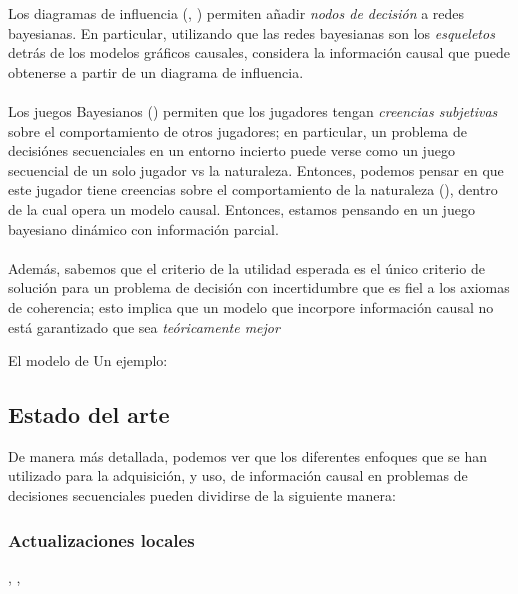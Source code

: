 \documentclass[11pt]{article}
\theoremstyle{plain}
\begin{document}
Los diagramas de influencia (\cite{jensen2001bayesian}, \cite{koller2009probabilistic}) permiten añadir \textit{nodos de decisión} a redes bayesianas. En particular, utilizando que las redes bayesianas son los \textit{esqueletos} detrás de los modelos gráficos causales,  \cite{dawid2002influence} considera la información causal que puede obtenerse a partir de un diagrama de influencia.\\
\\
Los juegos Bayesianos (\cite{harsanyi1967games}) permiten que los jugadores tengan \textit{creencias subjetivas} sobre el comportamiento de otros jugadores; en particular, un problema de decisiónes secuenciales en un entorno incierto puede verse como un juego secuencial de un solo jugador vs la naturaleza. Entonces, podemos pensar en que este jugador tiene creencias sobre el comportamiento de la naturaleza (\cite{monderer1997dynamic}), dentro de la cual opera un modelo causal. Entonces, estamos pensando en un juego bayesiano dinámico con información parcial.\\
\\
Además, sabemos que el criterio de la utilidad esperada es el único criterio de solución para un problema de decisión con incertidumbre que es fiel a los axiomas de coherencia; esto implica que un modelo que incorpore información causal no está garantizado que sea \textit{teóricamente mejor}


El modelo de \cite{witsenhausen1971information}
Un ejemplo: 
\subsection{Estado del arte}
De manera más detallada, podemos ver que los diferentes enfoques que se han utilizado para la adquisición, y uso, de información causal en problemas de decisiones secuenciales pueden dividirse de la siguiente manera:
\subsubsection{Actualizaciones locales}
\cite{heckerman2006bayesian}, 
\cite{wellen2012learning},
\cite{kummerfeld2013tracking}
\cite{bramley2017formalizing}
\end{document}
